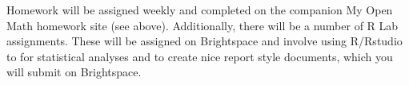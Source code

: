 Homework will be assigned weekly and completed on the companion My Open Math homework site (see above). Additionally, there will be a number of R Lab assignments. These will be assigned on Brightspace and involve using R/Rstudio to for statistical analyses and to create nice report style documents, which you will  submit on Brightspace.  